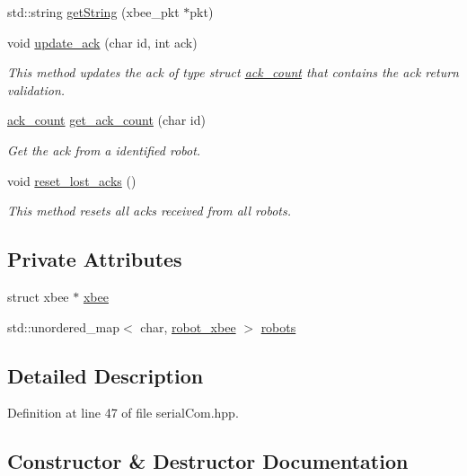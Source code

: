\begin{DoxyCompactItemize}
std\+::string \hyperlink{class_serial_com_a2171dcfcdcecc0ac18b9e206b28608be}{get\+String} (xbee\+\_\+pkt $\ast$pkt)
\item 
void \hyperlink{class_serial_com_af5ec587c5ade11ed2b68366ad4b79df2}{update\+\_\+ack} (char id, int ack)
\begin{DoxyCompactList}\small\item\em This method updates the ack of type struct \hyperlink{structack__count}{ack\+\_\+count} that contains the ack return validation. \end{DoxyCompactList}\item 
\hyperlink{structack__count}{ack\+\_\+count} \hyperlink{class_serial_com_af3bb19785d37bfbd6fde36e107fed1b1}{get\+\_\+ack\+\_\+count} (char id)
\begin{DoxyCompactList}\small\item\em Get the ack from a identified robot. \end{DoxyCompactList}\item 
void \hyperlink{class_serial_com_af6408a34f1d7260fc40ffc0f2bc452db}{reset\+\_\+lost\+\_\+acks} ()
\begin{DoxyCompactList}\small\item\em This method resets all acks received from all robots. \end{DoxyCompactList}\end{DoxyCompactItemize}
\subsection*{Private Attributes}
\begin{DoxyCompactItemize}
\item 
struct xbee $\ast$ \hyperlink{class_serial_com_ad5b8e665ab2218ad6caedd59738a7c12}{xbee}
\item 
std\+::unordered\+\_\+map$<$ char, \hyperlink{structrobot__xbee}{robot\+\_\+xbee} $>$ \hyperlink{class_serial_com_ae20f6fe8f53cb581b285924eda5ad01c}{robots}
\end{DoxyCompactItemize}


\subsection{Detailed Description}


Definition at line 47 of file serial\+Com.\+hpp.



\subsection{Constructor \& Destructor Documentation}
\mbox{\label{class_serial_com_af2d4922981a43216d0e7a2f0b02cfff7}} 
